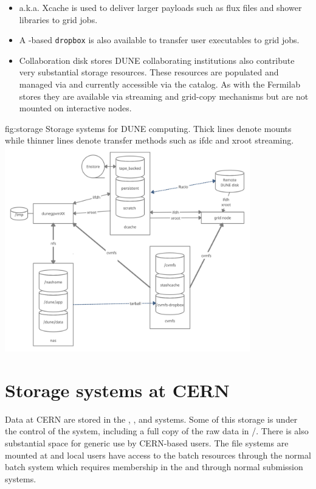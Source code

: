 \documentclass[../main-v1.tex]{subfiles}
\begin{document}
\begin{description}
\begin{itemize}
    \item {} a.k.a. Xcache is used to deliver larger payloads such as flux files and shower libraries to grid jobs.
    
    \item A -based  {\tt dropbox} is also available to transfer user executables to grid jobs. 
    
    



\item{Collaboration disk stores}
DUNE collaborating institutions also contribute very substantial storage resources. These resources are populated and managed via  and currently accessible via the  catalog. As with the Fermilab  stores they are available via streaming and grid-copy mechanisms but are not mounted on interactive nodes. 
 \end{itemize}


\end{description}
\begin{dunefigure}
{fig:storage}
{Storage systems for DUNE computing.  Thick lines denote mounts while thinner lines denote transfer methods such as ifdc and xroot streaming.}
\includegraphics[width=0.8\textwidth]{graphics/DataManagement/StorageMap2.png}
\end{dunefigure}

\section{Storage systems at CERN}

Data at CERN are stored in the , , and  systems.  Some of this storage is under the control of the  
system, including a full copy of the  raw data in /.  There is also substantial space for generic use by CERN-based users. The  file systems are mounted at  and local users have access to the  batch resources through the normal  batch system which requires membership in the   and through normal  submission systems.  
\end{document}
